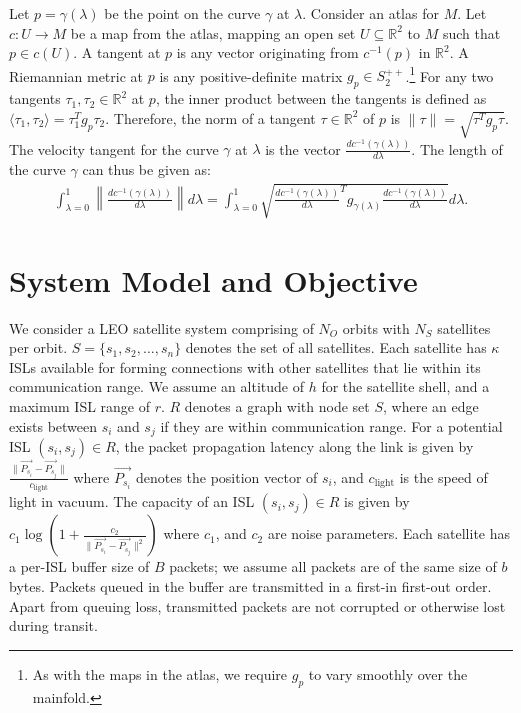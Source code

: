 \documentclass[acmsmall, screen]{acmart}
\begin{document}
Let $p = \gamma(\lambda)$ be the point on the curve $\gamma$ at $\lambda$. Consider an atlas for $M$. Let $c: U \rightarrow M$ be a map from the atlas, mapping an open set $U \subseteq \mathbb{R}^2$ to $M$ such that $p \in c(U)$. A tangent at $p$ is any vector originating from $c^{-1}(p)$ in $\mathbb{R}^2$. A Riemannian metric at $p$ is any positive-definite matrix $ g_p \in S_2^{++}$.\footnote{As with the maps in the atlas, we require $g_p$ to vary smoothly over the mainfold.}
For any two tangents $\tau_1, \tau_2 \in \mathbb{R}^2$ at $p$, the inner product between the tangents is defined as $\langle \tau_1, \tau_2 \rangle = \tau_1^T g_p \tau_2.$ Therefore, the norm of a tangent $\tau \in \mathbb{R}^2$ of $p$ is $ \| \tau \| = \sqrt{\tau^T g_p \tau}$. The velocity tangent for the curve $\gamma$ at $\lambda$ is the vector $\frac{d c^{-1}(\gamma(\lambda))}{d\lambda}$. The length of the curve $\gamma$ can thus be given as:
\begin{align}
\int_{\lambda=0}^1 \left\lVert  \frac{d c^{-1}(\gamma(\lambda))}{d\lambda} \right\rVert d\lambda = 
\int_{\lambda=0}^1 \sqrt{ \frac{d c^{-1}(\gamma(\lambda))}{d\lambda} ^T g_{\gamma(\lambda)} \frac{d c^{-1}(\gamma(\lambda))}{d\lambda}} d\lambda. 
\end{align}

\section{System Model and Objective}\label{modelObjective}
We consider a LEO satellite system comprising of $N_O$ orbits with $N_S$ satellites per orbit. $S = \{s_1, s_2, \ldots, s_{n}\}$ denotes the set of all satellites. Each satellite has $\kappa$ ISLs available for forming connections with other satellites that lie within its communication range. We assume an altitude of $h$ for the satellite shell, and a maximum ISL range of $r$. $R$ denotes a graph with node set $S$, where an edge exists between $s_i$ and $s_j$ if they are within communication range. For a potential ISL $(s_i, s_j) \in R$, the packet propagation latency along the link is given by $\frac{\|\vec{P_{s_i}} - \vec{P_{s_j}}\|}{c_\mathrm{light}}$ where $\vec{P_{s_i}}$ denotes the position vector of $s_i$, and $c_\mathrm{light}$ is the speed of light in vacuum. The capacity of an ISL $(s_i, s_j) \in R$ is given by $c_1 \log(1 + \frac{c_2}{\|\vec{P_{s_i}} - \vec{P_{s_j}}\|^2})$ where $c_1$, and $c_2$ are noise parameters. Each satellite has a per-ISL buffer size of $B$ packets; we assume all packets are of the same size of $b$ bytes. Packets queued in the buffer are transmitted in a first-in first-out order. Apart from queuing loss, transmitted packets are not corrupted or otherwise lost during transit. 
\end{document}
